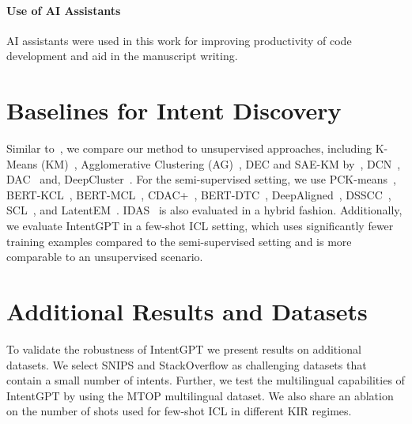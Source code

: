 \documentclass[11pt]{article}
\begin{document}
\paragraph{Use of AI Assistants}
AI assistants were used in this work for improving productivity of code development and aid in the manuscript writing.



\newpage

\appendix

\section{Baselines for Intent Discovery}

Similar to~\citet{kumar2022intent}, we compare our method to unsupervised approaches, including K-Means (KM)~\citep{macqueen1967some}, Agglomerative Clustering (AG)~\citep{gowda1978agglomerative}, DEC and SAE-KM by~\citet{xie2016unsupervised}, DCN~\citep{yang2017towards}, DAC~\citep{chang2017deep} and, DeepCluster~\citep{caron2018deep}. For the semi-supervised setting, we use PCK-means~\citep{basu2004active}, BERT-KCL~\citep{hsu2017learning}, BERT-MCL~\citep{hsu2019multi}, CDAC+~\citep{lin2020discovering}, BERT-DTC~\citep{han2019learning}, DeepAligned~\citep{zhang2021discovering}, DSSCC~\citep{kumar2022intent}, SCL~\citep{shen2021semi}, and LatentEM~\citep{zhou2023probabilistic}. IDAS~\citep{de2023idas} is also evaluated in a hybrid fashion. Additionally, we evaluate IntentGPT in a few-shot ICL setting, which uses significantly fewer training examples compared to the semi-supervised setting and is more comparable to an unsupervised scenario.

\section{Additional Results and Datasets} \label{additional-results}
To validate the robustness of IntentGPT we present results on additional datasets. We select SNIPS and StackOverflow as challenging datasets that contain a small number of intents. Further, we test the multilingual capabilities of IntentGPT by using the MTOP multilingual dataset. We also share an ablation on the number of shots used for few-shot ICL in different KIR regimes.
\end{document}
